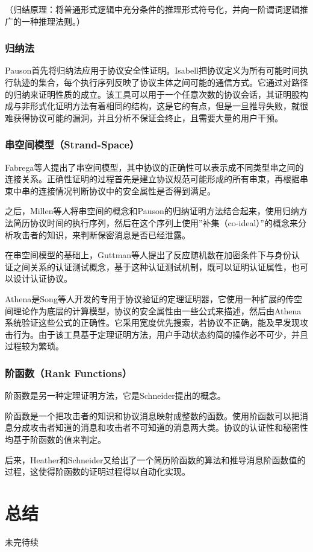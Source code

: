 \documentclass[cs4size,a4pape,UTF8]{ctexart}
\numberwithin{equation}{section}
\numberwithin{table}{section}
\numberwithin{figure}{section}
\begin{document}
（归结原理：将普通形式逻辑中充分条件的推理形式符号化，并向一阶谓词逻辑推广的一种推理法则。）

\subsubsection{归纳法}
Pauson首先将归纳法应用于协议安全性证明。Isabell把协议定义为所有可能时间执行轨迹的集合，每个执行序列反映了协议主体之间可能的通信方式。它通过对路径的归纳来证明性质的成立。该工具可以用于一个任意次数的协议会话，其证明股构成与非形式化证明方法有着相同的结构，这是它的有点，但是一旦推导失败，就很难获得协议可能的漏洞，并且分析不保证会终止，且需要大量的用户干预\cite{6}。

\subsubsection{串空间模型（Strand-Space）}
Fabrega等人提出了串空间模型，其中协议的正确性可以表示成不同类型串之间的连接关系。正确性证明的过程首先是建立协议规范可能形成的所有串束，再根据串束中串的连接情况判断协议中的安全属性是否得到满足。

之后，Millen等人将串空间的概念和Pauson的归纳证明方法结合起来，使用归纳方法简历协议时间的执行序列，然后在这个序列上使用''补集（co-ideal）''的概念来分析攻击者的知识，来判断保密消息是否已经泄露。

在串空间模型的基础上，Guttman等人提出了反应随机数在加密条件下与身份认证之间关系的认证测试概念，基于这种认证测试机制，既可以证明认证属性，也可以设计认证协议。

Athena是Song等人开发的专用于协议验证的定理证明器，它使用一种扩展的传空间理论作为底层的计算模型，协议的安全属性由一些公式来描述，然后由Athena系统验证这些公式的正确性。它采用宽度优先搜索，若协议不正确，能及早发现攻击行为。由于该工具基于定理证明方法，用户手动状态约简的操作必不可少，并且过程较为繁琐\cite{6}。

\subsubsection{阶函数（Rank Functions）}
阶函数是另一种定理证明方法，它是Schneider提出的概念。

阶函数是一个把攻击者的知识和协议消息映射成整数的函数。使用阶函数可以把消息分成攻击者知道的消息和攻击者不可知道的消息两大类。协议的认证性和秘密性均基于阶函数的值来判定。

后来，Heather和Schneider又给出了一个简历阶函数的算法和推导消息阶函数值的过程，这使得阶函数的证明过程得以自动化实现\cite{6}。


\section{总结}
未完待续

\clearpage
\end{document}
